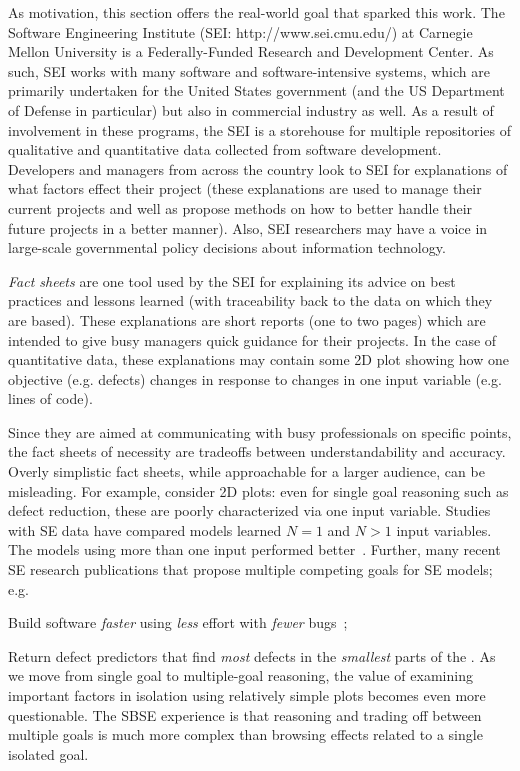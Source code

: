 
As motivation, this section  offers the real-world goal that
sparked this work.  The Software Engineering
Institute (SEI: http://www.sei.cmu.edu/) at Carnegie
Mellon University is a Federally-Funded Research and
Development Center. As such, SEI works with many
software and software-intensive systems, which are
primarily undertaken for the United States
government (and the US Department of Defense in
particular) but also in commercial industry as
well. As a result of involvement in these programs,
the SEI is a storehouse for multiple repositories of
qualitative and quantitative data collected from
software development.
Developers and managers from across the country look
to SEI for explanations of what factors effect their
project (these explanations are used to manage their
current projects and well as propose methods on how
to better handle their future projects in a better
manner).  Also, SEI researchers may have a
voice in large-scale governmental policy decisions about
information technology.

 
{\em Fact sheets} are one tool used by the SEI for explaining its advice
on best practices and lessons learned
(with
traceability back to the data on which they are
based).  These
explanations are short reports (one to two pages)  which are intended
to give busy managers quick guidance for their
projects. In the case of quantitative data, these
explanations may contain some 2D plot showing how
one objective (e.g. defects) changes in response to
changes in one input variable (e.g. lines of code).

 
Since they are aimed at communicating with busy
professionals on specific points, the fact sheets of
necessity are tradeoffs  between
understandability and accuracy. 
Overly simplistic fact sheets,
while approachable for a larger audience,
can be misleading.  For example, consider  2D plots:
even for single goal
reasoning such as defect reduction, these are
poorly characterized via one input variable. Studies with SE
data have compared models learned  $N =
1$  and $N > 1$ input variables. The models using
more than one input performed better~\cite{me07b}.
Further, many recent SE research publications that propose multiple competing
goals for SE models; e.g.
\bi
\item
Build software {\em faster} using {\em less} effort with {\em fewer} bugs~\cite{elrawas10};
\item
Return defect predictors that find {\em most} defects in the {\em smallest} parts of the 
\cite{arisholm6}.
\ei
As we move from single goal to multiple-goal reasoning, the value of examining important factors in isolation using relatively simple plots
becomes even more questionable. The SBSE experience is that reasoning and
trading off between multiple goals is much more complex than browsing effects related
to a single isolated goal.

